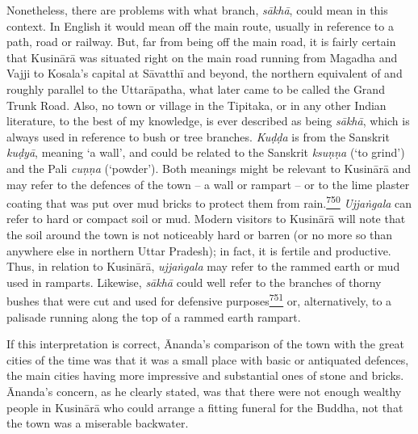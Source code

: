 \begin{description}
Nonetheless, there are problems with what branch, \emph{sākhā}, could
mean in this context. In English it would mean off the main route,
usually in reference to a path, road or railway. But, far from being off
the main road, it is fairly certain that Kusinārā was situated right on
the main road running from Magadha and Vajji to Kosala's capital at
Sāvatthī and beyond, the northern equivalent of and roughly parallel to
the Uttarāpatha, what later came to be called the Grand Trunk Road.
Also, no town or village in the Tipitaka, or in any other Indian
literature, to the best of my knowledge, is ever described as being
\emph{sākhā}, which is always used in reference to bush or tree
branches. \emph{Kuḍḍa} is from the Sanskrit \emph{kuḍyā}, meaning `a
wall', and could be related to the Sanskrit \emph{ksuṇṇa} (`to grind')
and the Pali \emph{cuṇṇa} (`powder'). Both meanings might be relevant to
Kusinārā and may refer to the defences of the town -- a wall or rampart
-- or to the lime plaster coating that was put over mud bricks to
protect them from
rain.\label{footprints_split_019.html_fnref750}\hyperref[footprints_split_025.htmlux5cux23fn750]{\textsuperscript{750}}
\emph{Ujjaṅgala} can refer to hard or compact soil or mud. Modern
visitors to Kusinārā will note that the soil around the town is not
noticeably hard or barren (or no more so than anywhere else in northern
Uttar Pradesh); in fact, it is fertile and productive. Thus, in relation
to Kusinārā, \emph{ujjaṅgala} may refer to the rammed earth or mud used
in ramparts. Likewise, \emph{sākhā} could well refer to the branches of
thorny bushes that were cut and used for defensive
purposes\label{footprints_split_019.html_fnref751}\hyperref[footprints_split_025.htmlux5cux23fn751]{\textsuperscript{751}}
or, alternatively, to a palisade running along the top of a rammed earth
rampart.

If this interpretation is correct, Ānanda's comparison of the town with
the great cities of the time was that it was a small place with basic or
antiquated defences, the main cities having more impressive and
substantial ones of stone and bricks. Ānanda's concern, as he clearly
stated, was that there were not enough wealthy people in Kusinārā who
could arrange a fitting funeral for the Buddha, not that the town was a
miserable backwater.


\end{description}
